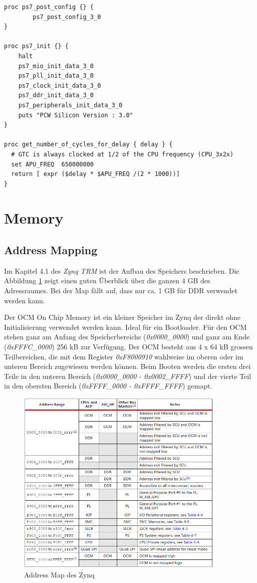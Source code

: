 \begin{enumerate}
\begin{lstlisting}[frame=single]
proc ps7_post_config {} {
        ps7_post_config_3_0   
}

proc ps7_init {} {
	halt
	ps7_mio_init_data_3_0
	ps7_pll_init_data_3_0
	ps7_clock_init_data_3_0
	ps7_ddr_init_data_3_0
	ps7_peripherals_init_data_3_0
	puts "PCW Silicon Version : 3.0"
}

proc get_number_of_cycles_for_delay { delay } {
  # GTC is always clocked at 1/2 of the CPU frequency (CPU_3x2x)
  set APU_FREQ  650000000
  return [ expr ($delay * $APU_FREQ /(2 * 1000))]
}
\end{lstlisting}

\end{enumerate}





\section{Memory}
\subsection{Address Mapping}
Im Kapitel 4.1 des \textit{Zynq TRM}\cite{bib:ZynqTechnicalReferenceManual} ist der Aufbau des Speichers beschrieben.
Die Abbildung \ref{fig:AddressMapZynq} zeigt einen guten Überblick über die ganzen 4 GB des Adressraumes.
Bei der Map fällt auf, dass nur ca. 1 GB für DDR verwendet werden kann.

Der OCM {On Chip Memory} ist ein kleiner Speicher im Zynq der direkt ohne Initialisierung verwendet werden kann. 
Ideal für ein Bootloader.
Für den OCM stehen ganz am Anfang des Speicherbereichs (\textit{0x0000\_0000}) und ganz am Ende (\textit{0xFFFC\_0000}) 256 kB zur Verfügung.
Der OCM besteht aus 4 x 64 kB grossen Teilbereichen, die mit dem Register \textit{0xF8000910} wahlweise im oberen oder im unteren Bereich zugewiesen werden können.
Beim Booten werden die ersten drei Teile in den unteren Bereich (\textit{0x0000\_0000 - 0x0002\_FFFF}) und der vierte Teil in den obersten Bereich (\textit{0xFFFF\_0000 - 0xFFFF\_FFFF}) gemapt.

\begin{figure}[htbp]
	\centering
		\includegraphics[width=10cm,height=\textheight,keepaspectratio]{images/AddressMapZynq.png}
	\caption[]{Address Map des Zynq}
	\label{fig:AddressMapZynq}
\end{figure}




